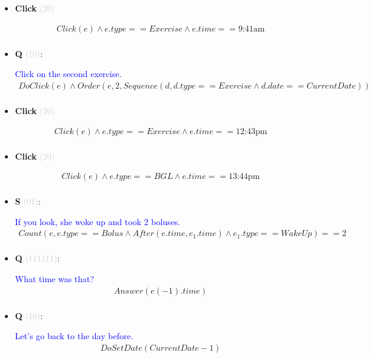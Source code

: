 \documentclass[11pt]{article}
\newcounter{CQ}
\newcounter{CS}
\newcounter{CClick}
\newcommand{\key}[1]{\textcolor{lightgray}{#1}}
\begin{document}
\begin{itemize}
	\item
	\textbf{Click\theCClick} \key{(20)} \addtocounter{CClick}{1}
	\begin{multline*}
	Click(e) \wedge e.type == Exercise \wedge e.time == \mbox{9:41am}  \\
	\end{multline*}
	
	
	
	\item
	\textbf{Q\theCQ} \key{(10)}: \addtocounter{CQ}{1}
	\textcolor{blue}{ Click on the second exercise. }
	\begin{multline*}
	DoClick(e) \wedge  Order(e, 2, Sequence(d, d.type==Exercise \wedge d.date==CurrentDate))  \\
	\end{multline*}
	
	
	\item
	\textbf{Click\theCClick} \key{(20)} \addtocounter{CClick}{1}
	\begin{multline*}
	Click(e) \wedge e.type == Exercise \wedge e.time == \mbox{12:43pm}  \\
	\end{multline*}
	
	
	\item
	\textbf{Click\theCClick} \key{(20)} \addtocounter{CClick}{1}
	\begin{multline*}
	Click(e) \wedge e.type == BGL \wedge e.time == \mbox{13:44pm}  \\
	\end{multline*}
	
	
	
	\item
	\textbf{S\theCS} \key{(01)}: \addtocounter{CS}{1}
	\textcolor{blue}{ If you look, she woke up and took 2 boluses. }
	\begin{multline*}
	Count(e, e.type==Bolus \wedge After(e.time, e_1.time) \wedge e_1.type==WakeUp)==2 \\
	\end{multline*}
	
	
	\item
	\textbf{Q\theCQ} \key{(111111)}: \addtocounter{CQ}{1}
	\textcolor{blue}{ What time was that? }
	\begin{multline*}
	Answer(e(-1).time) \\
	\end{multline*}
	
	
	\item
	\textbf{Q\theCQ} \key{(10)}: \addtocounter{CQ}{1}
	\textcolor{blue}{ Let's go back to the day before. }
	\begin{multline*}
	DoSetDate(CurrentDate - 1) \\
	\end{multline*}
	

\end{itemize}
\end{document}
